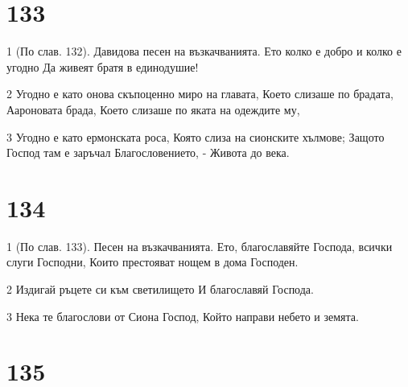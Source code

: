 \chapter{133}

\par 1 (По слав. 132). Давидова песен на възкачванията. Ето колко е добро и колко е угодно Да живеят братя в единодушие!
\par 2 Угодно е като онова скъпоценно миро на главата, Което слизаше по брадата, Аароновата брада, Което слизаше по яката на одеждите му,
\par 3 Угодно е като ермонската роса, Която слиза на сионските хълмове; Защото Господ там е заръчал Благословението, - Живота до века.

\chapter{134}

\par 1 (По слав. 133). Песен на възкачванията. Ето, благославяйте Господа, всички слуги Господни, Които престояват нощем в дома Господен.
\par 2 Издигай ръцете си към светилището И благославяй Господа.
\par 3 Нека те благослови от Сиона Господ, Който направи небето и земята.

\chapter{135}

